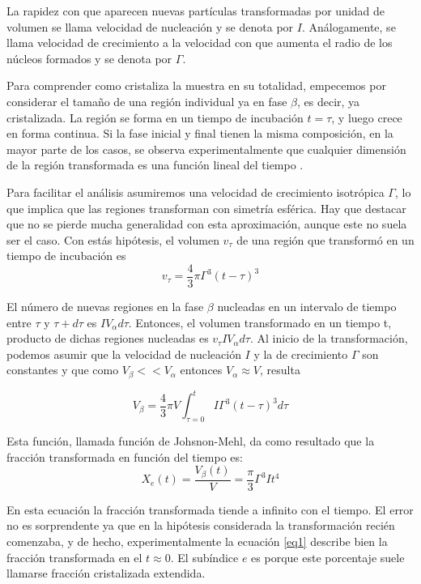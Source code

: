 \documentclass[12pt]{article}
\theoremstyle{definition}
\theoremstyle{remark}
\begin{document}
La rapidez con que aparecen nuevas partículas transformadas por unidad de volumen se llama velocidad de nucleación y se denota por $I$. Análogamente, se llama velocidad de crecimiento a la velocidad con que aumenta el radio de los núcleos formados y se denota por $\Gamma$.

Para comprender como cristaliza la muestra en su totalidad, empecemos por
considerar el tamaño de una región individual ya en fase $\beta$, es decir, ya cristalizada. La región se forma en un tiempo de incubación $t=\tau$, y luego crece en forma continua. Si la fase inicial y final tienen la misma composición, en la mayor parte de los casos, se observa experimentalmente que cualquier dimensión de la región transformada es una función lineal del tiempo \cite{Transformations2002}.

Para facilitar el análisis asumiremos una velocidad de crecimiento isotrópica $\Gamma$, lo que implica que las regiones transforman con simetría esférica. Hay que destacar que no se pierde mucha generalidad con esta aproximación, aunque este no suela ser el caso. Con estás hipótesis, el volumen $v_\tau$ de una región que transformó en un tiempo de incubación es 
\begin{equation}
	v_\tau = \frac{4}{3}\pi \Gamma^3(t-\tau)^3
\end{equation}

El número de nuevas regiones en la fase $\beta$ nucleadas en un intervalo de tiempo entre $\tau$ y $\tau + d\tau$ es $IV_\alpha d\tau$. Entonces, el volumen transformado en un tiempo t, producto de dichas regiones nucleadas es $v_\tau IV_\alpha d\tau$. Al inicio de la transformación, podemos asumir que la velocidad de nucleación $I$ y la de crecimiento $\Gamma$ son constantes y que como $V_\beta << V_\alpha$ entonces $V_\alpha \approx V$, resulta

\begin{equation}
\label{integral}
	V_\beta = \frac{4}{3}\pi V \int_{\tau = 0}^{t} I\Gamma^3(t-\tau)^3d\tau
\end{equation}

Esta función, llamada función de Johsnon-Mehl, da como resultado que la fracción transformada en función del tiempo es:
\begin{equation}
\label{eq1}
	X_e(t) = \frac{V_\beta (t)}{V} = \frac{\pi}{3}\Gamma^3 I t^4
\end{equation}

En esta ecuación la fracción transformada tiende a infinito con el tiempo. El error no es sorprendente ya que en la hipótesis considerada la transformación recién comenzaba, y de hecho, experimentalmente la ecuación \ref{eq1} describe bien la fracción transformada en el $t \approx 0$. El subíndice $e$ es porque este porcentaje suele llamarse fracción cristalizada extendida.
\end{document}
